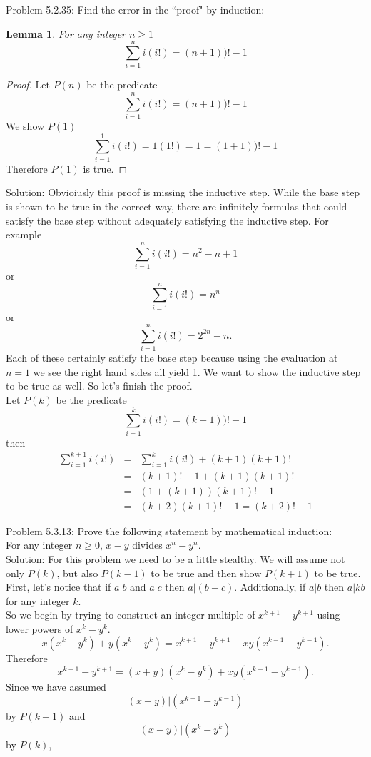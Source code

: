 \documentclass[10 pt]{amsart}
\newtheorem{lem}[thm]{Lemma}
\theoremstyle{definition}
\theoremstyle{remark}
\numberwithin{equation}{subsection}
\begin{document}
\newpage

Problem 5.2.35: Find the error in the ``proof" by induction:
\begin{lem}
For any integer $n\geq 1$
\[
\sum_{i=1}^{n} i(i!) = (n+1))! -1
\]
\end{lem}

\begin{proof}
Let $P(n)$ be the predicate
\[
\sum_{i=1}^{n} i(i!) = (n+1))! -1
\]
We show $P(1)$
\[
\sum_{i=1}^{1} i(i!) = 1(1!) = 1 = (1+1))! -1
\]
Therefore $P(1)$ is true.
\end{proof}

Solution:  Obvioiusly this proof is missing the inductive step.  While the base step is shown to be true in the correct way, there are infinitely formulas that could satisfy the base step without adequately satisfying the inductive step.  For example
\[
\sum_{i=1}^{n} i(i!) = n^2-n+1
\]
or
\[
\sum_{i=1}^{n} i(i!) = n^n
\]
or 
\[
\sum_{i=1}^{n} i(i!) = 2^{2n}-n.
\]
Each of these certainly satisfy the base step because using the evaluation at $n=1$ we see the right hand sides all yield 1.  We want to show the inductive step to be true as well.  So let's finish the proof.\\

Let $P(k)$ be the predicate
\[
\sum_{i=1}^{k} i(i!) = (k+1))! -1
\]
then
\begin{eqnarray*}
\sum_{i=1}^{k+1} i(i!) &=& \sum_{i=1}^{k} i(i!) + (k+1)(k+1)!\\
&=& (k+1)!-1 + (k+1)(k+1)!\\
&=& (1+(k+1))(k+1)! - 1\\
&=& (k+2)(k+1)!-1 = (k+2)!-1 
\end{eqnarray*}




\newpage
Problem 5.3.13: Prove the following statement by mathematical induction:\\
For any integer $n\geq 0$, $x-y$ divides $x^n-y^n$.\\

Solution:  For this problem we need to be a little stealthy.  We will assume not only $P(k)$, but also $P(k-1)$ to be true and then show $P(k+1)$ to be true.  First, let's notice that if $a|b$ and $a|c$ then $a|(b+c)$.  Additionally, if $a|b$ then $a|kb$ for any integer $k$.\\

So we begin by trying to construct an integer multiple of $x^{k+1}-y^{k+1}$ using lower powers of $x^k-y^k$.
\[
x(x^k-y^k) + y(x^k-y^k) = x^{k+1}-y^{k+1} - xy(x^{k-1}-y^{k-1}).
\]
Therefore
\[
x^{k+1}-y^{k+1}= (x+y)(x^k-y^k) + xy(x^{k-1}-y^{k-1}).
\]
Since we have assumed 
\[
(x-y)|(x^{k-1}-y^{k-1})
\]
 by $P(k-1)$ and
\[
(x-y)|(x^{k}-y^{k})
\] by $P(k)$,
\end{document}
